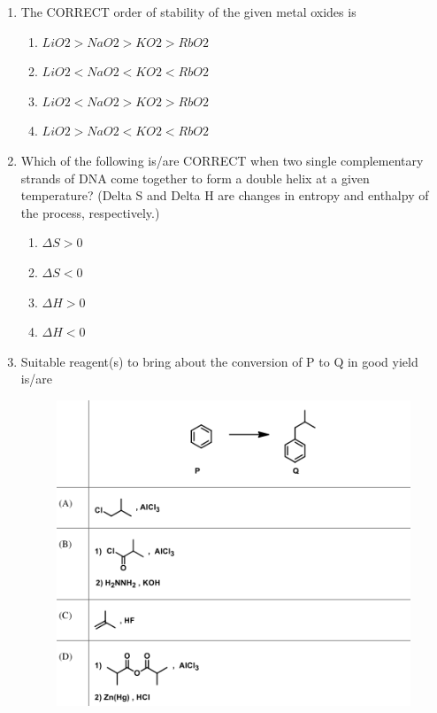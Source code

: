\documentclass[journal,12pt,onecolumn]{IEEEtran}
\begin{document}
\begin{enumerate}
    \item The CORRECT order of stability of the given metal oxides is
    \begin{enumerate}
        \item $LiO2 > NaO2 > KO2 > RbO2$
        \item $LiO2 < NaO2 < KO2 < RbO2$
        \item $LiO2 < NaO2 > KO2 > RbO2$
        \item $LiO2 > NaO2 < KO2 < RbO2$
    \end{enumerate}

    \item Which of the following is/are CORRECT when two single complementary strands of DNA come together to form a double helix at a given temperature? (Delta S and Delta H are changes in entropy and enthalpy of the process, respectively.)
    \begin{enumerate}
        \item $\Delta S > 0$
        \item $\Delta S < 0$
        \item $\Delta H > 0$
        \item $\Delta H < 0$
    \end{enumerate}

    \item Suitable reagent(s) to bring about the conversion of P to Q in good yield is/are
    \begin{figure}[H]
		\centering
	    \includegraphics[scale=0.6]{15}
		    \caption*{}
		\label{fig:Q15}
	\end{figure}


\end{enumerate}
\end{document}
